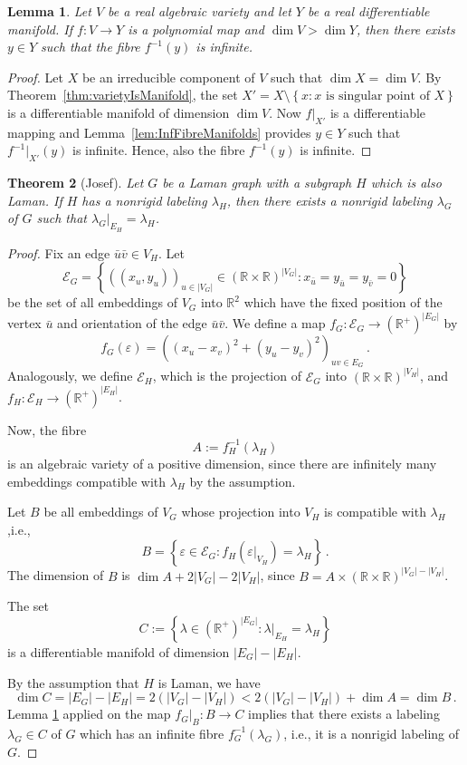 \documentclass[a4paper, 11pt]{article}
\newcommand{\RR}{\mathbb{R}}
\newtheorem{thm}{Theorem}[section]
\newtheorem{lem}[thm]{Lemma}
\theoremstyle{definition}
\begin{document}
\begin{lem}
\label{lem:InfFibre}
Let $V$ be a real algebraic variety and let $Y$ be a real differentiable manifold. If $f:V\rightarrow Y$  is a polynomial map  and $\dim V > \dim Y$, then there exists $y\in Y$ such that the fibre $f^{-1}(y)$ is infinite.
\end{lem}
\begin{proof}
Let $X$ be an irreducible component of $V$ such that $\dim X=\dim V$. By Theorem~\ref{thm:varietyIsManifold}, the set $X'=X\setminus\left\{x\colon x \text{ is singular point of } X\right\}$ is a differentiable manifold of dimension $\dim V$. Now $f|_{X'}$ is a differentiable mapping and  Lemma~\ref{lem:InfFibreManifolds} provides $y\in Y$ such that $f^{-1}|_{X'}(y)$ is infinite. Hence, also the fibre $f^{-1}(y)$ is infinite.
\end{proof}

\begin{thm}[Josef]
\label{thm:nonrigidLamanSubgraph}
Let $G$ be a Laman graph with a subgraph $H$ which is also Laman. If $H$ has a nonrigid labeling $\lambda_H$, then there exists a nonrigid labeling $\lambda_G$ of $G$  such that $\lambda_G|_{E_H}=\lambda_H$.
\end{thm}

\begin{proof}
Fix an edge $\bar{u}\bar{v}\in V_H$. Let 
$$\mathcal{E}_G=\left\{\left((x_u,y_u)\right)_{u\in|V_G|}\in \left(\RR\times\RR\right)^{|V_G|} \colon x_{\bar{u}}=y_{\bar{u}}=y_{\bar{v}}=0\right\}$$
 be the set of all embeddings of $V_G$ into $\RR^2$ which have the fixed position of the vertex $\bar{u}$ and orientation of the edge $\bar{u}\bar{v}$.
We define a map $f_G:\mathcal{E}_G \rightarrow (\RR^+)^{|E_G|}$ by 
$$
f_G(\varepsilon)=\left( (x_u-x_v)^2+(y_u-y_v)^2 \right)_{uv\in E_G}\,.
$$
Analogously, we define $\mathcal{E}_H$, which is the projection of $\mathcal{E}_G$ into $(\RR\times\RR)^{|V_H|}$, and $f_H:\mathcal{E}_H \rightarrow (\RR^+)^{|E_H|}$.

Now, the fibre $$A:=f_H^{-1}(\lambda_H)$$ is an algebraic variety of a positive dimension, since  there are infinitely many embeddings compatible with $\lambda_H$ by the  assumption. 

Let $B$ be all embeddings of $V_G$ whose projection into $V_H$ is compatible with $\lambda_H$,i.e., 
$$B=\left\{\varepsilon\in \mathcal{E}_G \colon f_H(\varepsilon|_{V_H})=\lambda_H\right\}\,.$$
 The dimension of $B$ is $\dim A+2|V_G|-2|V_H|$, since $B=A \times (\RR\times\RR)^{|V_G|-|V_H|}$.

The set $$C:=\left\{\lambda \in (\RR^+)^{|E_G|} \colon \lambda|_{E_H}=\lambda_H\right\}$$ 
is a differentiable manifold of dimension $|E_G|-|E_H|$.

By the assumption that $H$ is Laman, we have
$$
\dim C=|E_G|-|E_H|=2(|V_G|-|V_H|)<2(|V_G|-|V_H|)+\dim A=\dim B\,.
$$
Lemma \ref{lem:InfFibre} applied on the map $f_G|_B:B\rightarrow C$ implies that there exists a labeling $\lambda_G\in C$ of $G$ which has an infinite fibre $f_G^{-1}(\lambda_G)$, i.e., it is a nonrigid labeling of $G$.

\end{proof}
\end{document}
